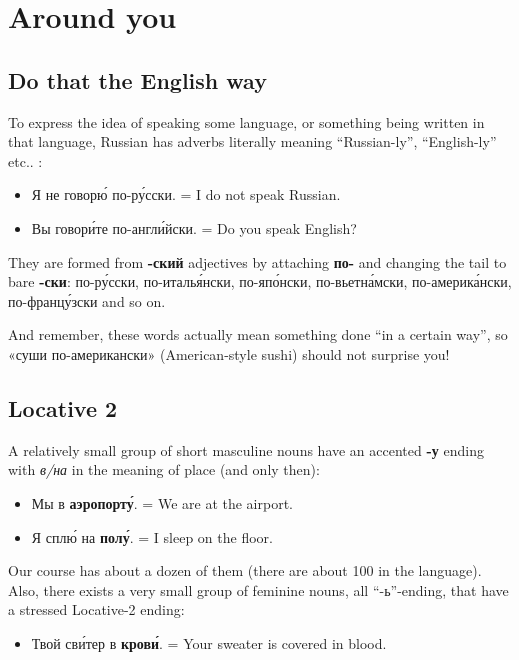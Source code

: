 \chapter{Around you}\label{around-you}

\section{Do that the English way}\label{do-that-the-english-way}

To express the idea of speaking some language, or something being
written in that language, Russian has adverbs literally meaning
``Russian-ly'', ``English-ly'' etc.. :

\begin{itemize}
\tightlist
\item
  Я не говор\'{ю} по-р\'{у}сски. = I do not speak Russian.
\item
  Вы говор\'{и}те по-англ\'{и}йски. = Do you speak English?
\end{itemize}

They are formed from \textbf{-ский} adjectives by attaching \textbf{по-}
and changing the tail to bare \textbf{-ски}: по-р\'{у}сски, по-италь\'{я}нски,
по-яп\'{о}нски, по-вьетн\'{а}мски, по-америк\'{а}нски, по-франц\'{у}зски and so on.

And remember, these words actually mean something done ``in a certain
way'', so «суши по-американски» (American-style sushi) should not
surprise you!

\section{Locative 2}\label{locative-2}

A relatively small group of short masculine nouns have an accented
\textbf{-у} ending with \emph{в/на} in the meaning of place (and only
then):

\begin{itemize}
\tightlist
\item
  Мы в \textbf{аэропорт\'{у}}. = We are at the airport.
\item
  Я спл\'{ю} на \textbf{пол\'{у}}. = I sleep on the floor.
\end{itemize}

Our course has about a dozen of them (there are about 100 in the
language). Also, there exists a very small group of feminine nouns, all
``-ь''-ending, that have a stressed Locative-2 ending:

\begin{itemize}
\tightlist
\item
  Твой св\'{и}тер в \textbf{кров\'{и}}. = Your sweater is covered in blood.
\end{itemize}

